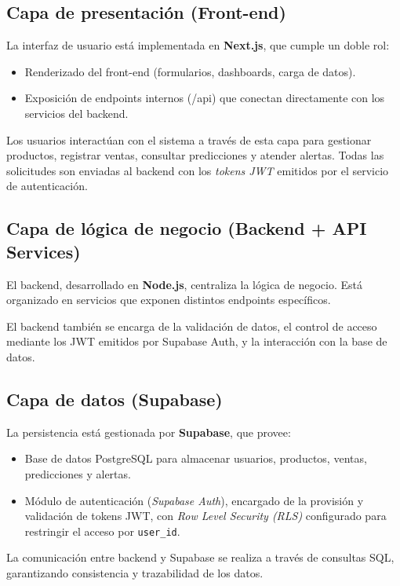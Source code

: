 \subsection{Capa de presentación (Front-end)}

La interfaz de usuario está implementada en \textbf{Next.js}, que cumple un doble rol:
\begin{itemize}
    \item Renderizado del front-end (formularios, dashboards, carga de datos).
    \item Exposición de endpoints internos (/api) que conectan directamente con los servicios del backend.
\end{itemize}

Los usuarios interactúan con el sistema a través de esta capa 
para gestionar productos, registrar ventas, consultar predicciones 
y atender alertas. Todas las solicitudes son enviadas al backend 
con los \textit{tokens JWT} emitidos por el servicio de autenticación.

\subsection{Capa de lógica de negocio (Backend + API Services)}

El backend, desarrollado en \textbf{Node.js}, centraliza la lógica de negocio. 
Está organizado en servicios que exponen distintos endpoints específicos.

El backend también se encarga de la validación de datos, el control 
de acceso mediante los JWT emitidos por Supabase Auth, y la interacción 
con la base de datos.

\subsection{Capa de datos (Supabase)}

La persistencia está gestionada por \textbf{Supabase}, que provee:
\begin{itemize}
    \item Base de datos PostgreSQL para almacenar usuarios, productos, ventas, predicciones y alertas.
    \item Módulo de autenticación (\textit{Supabase Auth}), encargado de la provisión y validación de tokens JWT, con \textit{Row Level Security (RLS)} configurado para restringir el acceso por \texttt{user\_id}.
\end{itemize}

La comunicación entre backend y Supabase se realiza a través de 
consultas SQL, garantizando consistencia y trazabilidad de los datos.

